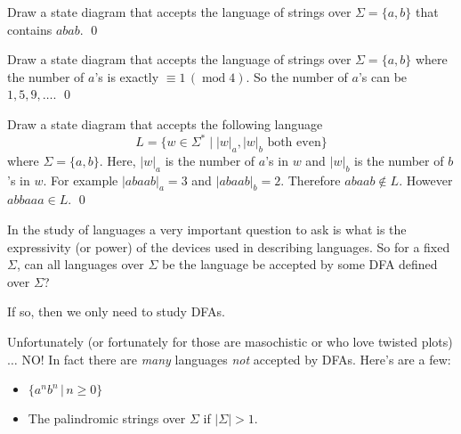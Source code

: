 \newpage
\begin{ex}
Draw a state diagram that accepts the language of strings over 
$\Sigma = \{a, b\}$ that contains $abab$.
\qed
\end{ex}

\newpage
\begin{ex}
Draw a state diagram that accepts the language of strings over 
$\Sigma = \{a, b\}$ where the number of $a$'s is exactly 
$\equiv 1 \, (\operatorname{mod} 4)$.
So the number of $a$'s can be $1, 5, 9, \ldots$.
\qed
\end{ex}


\newpage
\begin{ex}
  Draw a state diagram that accepts the following language
  \[
  L = \{w \in \Sigma^* \mid |w|_a, |w|_b \text{ both even}\}
  \]
  where $\Sigma = \{a, b\}$.
  Here, 
  $|w|_a$ is the number of $a$'s in $w$
  and
  $|w|_b$ is the number of $b$'s in $w$.
  For example $|abaab|_a = 3$ and $|abaab|_b = 2$.
  Therefore $abaab \not\in L$.
  However $abbaaa \in L$.
  \qed
\end{ex}


\newpage
In the study of languages a very important question to ask is what
is the expressivity (or power) of the devices used in describing
languages. So for a  fixed $\Sigma$, can all languages over $\Sigma$
be the language be accepted by some DFA defined over $\Sigma$?

If so, then we only need to study DFAs.

Unfortunately (or fortunately for those are masochistic or who love
twisted plots) $\ldots$ NO! In fact there are
\textit{many} languages
\textit{not} accepted by DFAs. Here's are a few: 
\begin{itemize}
 \item $\{a^nb^n \,|\, n\geq 0\}$
 \item The palindromic strings over $\Sigma$ if $|\Sigma|>1$.
\end{itemize}
